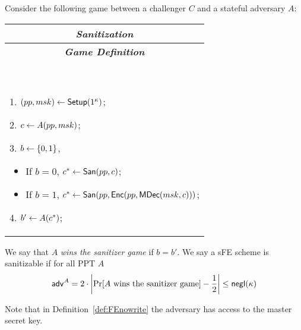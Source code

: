 \documentclass{llncs}
\begin{document}
\begin{defi} \label{def:FEnowrite}
Consider the following game between a challenger $C$ and a stateful adversary $A$:
\begin{center}
\begin{small}
    \begin{tabular}{| p{8cm} |}
    \hline
	\multicolumn{1}{|c|}{\textbf{\emph{Sanitization}}} \\
	\hline
	\multicolumn{1}{|c|}{\textbf{\emph{Game Definition}}}  \\
	\hline
	\

	1. $(pp,msk)\leftarrow \mathsf{Setup}(1^\kappa)$;

	2. $c \leftarrow A(pp,msk)$;

	3. $b\leftarrow \{0,1\}$, 
	\begin{itemize}
		\item If $b=0$, $c^*\leftarrow \mathsf{San}(pp,c)$;
		\item If $b=1$, $c^*\leftarrow \mathsf{San}(pp,\mathsf{Enc}(pp,\mathsf{MDec}(msk,c)))$; 
	\end{itemize}
	4. $b' \leftarrow A(c^*)$;

	\\
	\hline
	\end{tabular}
\end{small}
\end{center}
We say that $A$ \emph{wins the sanitizer game} if $b=b'$.
We say a sFE scheme is sanitizable if for all PPT $A$
$$
\mathsf{adv}^{A} = 2\cdot \left|\Pr[A \mbox{ wins the sanitizer game}]-\frac{1}{2}\right|\leq \mathsf{negl}(\kappa)
$$ 
\end{defi}

Note that in Definition~\ref{def:FEnowrite} the adversary has access to the master secret key.
\end{document}
